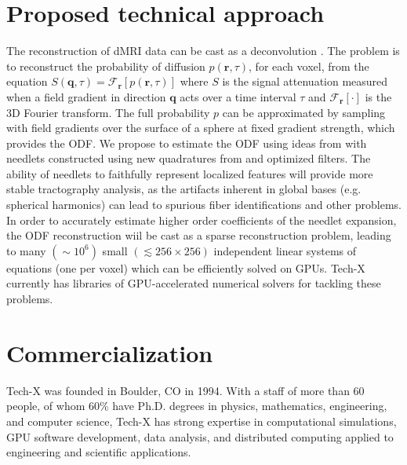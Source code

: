 \documentclass[10pt]{article}
\begin{document}
\section*{Proposed technical approach}
\vspace{-5pt}
The reconstruction of dMRI data can be cast as a
deconvolution \cite{Lenglet2008}. The problem is
to reconstruct the probability of diffusion $p({\mathbf r},\tau)$, for each
voxel, from the equation $S\left({\mathbf q},\tau\right) = \mathcal{F}_{\mathbf r}\left[p({\mathbf r},\tau)\right]$ where $S$ is the signal attenuation measured when a field gradient in
direction ${\mathbf q}$ acts over a time interval $\tau$ and $\mathcal{F}_{\mathbf r}\left[\cdot\right]$ is
the 3D Fourier transform.  The full probability $p$ can be approximated by sampling
with field gradients over the surface of a sphere at fixed gradient strength, which provides the 
ODF. We propose to estimate the ODF using ideas from
\cite{KE-NG-PI-2009} with needlets constructed using new quadratures from
\cite{AHR-BEY-2009} and optimized filters.  The ability of needlets to
faithfully represent localized features will provide more stable
tractography analysis, as the artifacts inherent in global bases
(e.g. spherical harmonics) can lead to spurious fiber identifications and other
problems.  In order to accurately estimate higher order coefficients of the
needlet expansion, the ODF reconstruction wiil be cast as a sparse reconstruction
problem, leading to many $(\sim 10^6)$ small $(\lesssim 256\times256)$ independent linear
systems of equations (one per voxel) which can be efficiently solved on GPUs. Tech-X currently
has libraries of GPU-accelerated numerical solvers for tackling these problems.

\vspace{-8pt}
\section*{Commercialization}
\vspace{-5pt}
Tech-X was founded in Boulder, CO in 1994. With a staff of more than 60 people,
of whom 60\% have Ph.D. degrees in physics, mathematics, engineering, and
computer science, Tech-X has strong expertise in computational simulations, GPU
software development, data analysis, and distributed computing applied to
engineering and scientific applications.
\end{document}
